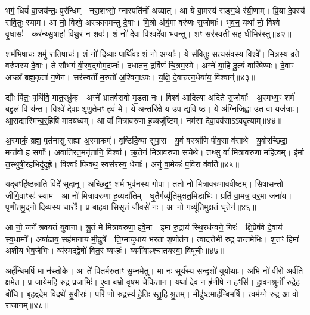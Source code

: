 भगं॒ धियं॑ वा॒जय॑न्तः॒ पुर॑न्धिम्।
नरा॒शꣳसो॒ ग्नास्पति॑र्नो अव्यात्।
आ ये वा॒मस्य॑ सङ्ग॒थे र॑यी॒णाम्।
प्रि॒या दे॒वस्य॑ सवि॒तुः स्या॑म।
आ नो॒ विश्वे॒ अस्क्रा॑गमन्तु दे॒वाः।
मि॒त्रो अ॑र्य॒मा वरु॑णः स॒जोषाः᳚।
भुव॒न्॒ यथा॑ नो॒ विश्वे॑ वृ॒धासः॑।
कर᳚न्थ्सु॒षाहा॑ विथु॒रं न शवः॑।
शं नो॑ दे॒वा वि॒श्वदे॑वा भवन्तु।
शꣳ सर॑स्वती स॒ह धी॒भिर॑स्तु॥४२॥\ip

शम॑भि॒षाचः॒ शमु॑ राति॒षाचः॑।
शं नो॑ दि॒व्याः पार्थि॑वाः॒ शं नो॒ अप्याः᳚।
ये स॑वि॒तुः स॒त्यस॑वस्य॒ विश्वे᳚।
मि॒त्रस्य॑ व्र॒ते वरु॑णस्य दे॒वाः।
ते सौभ॑गं वी॒रव॒द्गोम॒दप्नः॑।
दधा॑तन॒ द्रवि॑णं चि॒त्रम॒स्मे।
अग्ने॑ या॒हि दू॒त्यं॑ वारि॑षेण्यः।
दे॒वाꣳ अच्छा᳚ ब्रह्म॒कृता॑ ग॒णेन॑।
सर॑स्वतीं म॒रुतो॑ अ॒श्विना॒\-ऽपः।
य॒क्षि॒ दे॒वान्र॑त्न॒धेया॑य॒ विश्वान्॑॥४३॥\ip

द्यौः पि॑तः॒ पृथि॑वि॒ मात॒रध्रु॑क्।
अग्ने᳚ भ्रातर्वसवो मृ॒डता॑ नः।
विश्व॑ आदित्या अदिते स॒जोषाः᳚।
अ॒स्मभ्य॒ꣳ॒ शर्म॑ बहु॒लं वि य॑न्त।
विश्वे॑ देवाः शृणु॒तेमꣳ हवं॑ मे।
ये अ॒न्तरि॑क्षे॒ य उप॒ द्यवि॒ ष्ठ।
ये अ॑ग्निजि॒ह्वा उ॒त वा॒ यज॑त्राः।
आ॒सद्या॒स्मिन्ब॒र्॒हिषि॑ मादयध्वम्।
आ वां᳚ मित्रावरुणा ह॒व्यजु॑ष्टिम्।
नम॑सा देवा॒वव॑साऽऽववृत्याम्॥४४॥\ip

अ॒स्माकं॒ ब्रह्म॒ पृत॑नासु सह्या अ॒स्माकम्᳚।
वृ॒ष्टिर्दि॒व्या सु॑पा॒रा।
यु॒वं वस्त्रा॑णि पीव॒सा व॑साथे।
यु॒वोरच्छि॑द्रा॒ मन्त॑वो ह॒ सर्गाः᳚।
अवा॑तिरत॒मनृ॑तानि॒ विश्वा᳚।
ऋ॒तेन॑ मित्रावरुणा सचेथे।
तथ्सु वां᳚ मित्रावरुणा महि॒त्वम्।
ई॒र्मा त॒स्थुषी॒रह॑भिर्दुदुह्रे।
विश्वाः᳚ पिन्वथ॒ स्वस॑रस्य॒ धेनाः᳚।
अनु॑ वा॒मेकः॑ प॒विरा व॑वर्ति॥४५॥\ip

यद्बꣳहि॑ष्ठ॒न्नाति॒ विदे॑ सुदानू।
अच्छि॑द्र॒ꣳ॒ शर्म॒ भुव॑नस्य गोपा।
ततो॑ नो मित्रावरुणाववीष्टम्।
सिषा॑सन्तो जीगि॒वाꣳसः॑ स्याम।
आ नो॑ मित्रावरुणा ह॒व्यदा॑तिम्।
घृ॒तैर्गव्यू॑तिमुक्षत॒मिडा॑भिः।
प्रति॑ वा॒मत्र॒ वर॒मा जना॑य।
पृ॒णी॒तमु॒द्नो दि॒व्यस्य॒ चारोः᳚।
प्र बा॒हवा॑ सिसृतं जी॒वसे॑ नः।
आ नो॒ गव्यू॑तिमुक्षतं घृ॒तेन॑॥४६॥\ip

आ नो॒ जने᳚ श्रवयतं युवाना।
श्रु॒तं मे॑ मित्रावरुणा॒ हवे॒मा।
इ॒मा रु॒द्राय॑ स्थि॒रध॑न्वने॒ गिरः॑।
क्षि॒प्रेष॑वे दे॒वाय॑ स्व॒धाम्ने᳚।
अषा॑ढाय॒ सह॑मानाय मी॒ढुषे᳚।
ति॒ग्मायु॑धाय भरता शृ॒णोत॑न।
त्वाद॑त्तेभी रुद्र॒ शन्त॑मेभिः।
श॒तꣳ हिमा॑ अशीय भेष॒जेभिः॑।
व्य॑स्मद्द्वेषो॑ वित॒रं व्यꣳहः॑।
व्यमी॑वाꣴश्चातयस्वा॒ विषू॑चीः॥४७॥\ip

अर्\mbox{}ह॑न्बिभर्\mbox{}षि॒ मा न॑स्तो॒के।
आ ते॑ पितर्मरुताꣳ सु॒म्नमे॑तु।
मा नः॒ सूर्य॑स्य स॒न्दृशो॑ युयोथाः।
अ॒भि नो॑ वी॒रो अर्व॑ति क्षमेत।
प्र जा॑येमहि रुद्र प्र॒जाभिः॑।
ए॒वा ब॑भ्रो वृषभ चेकितान।
यथा॑ देव॒ न हृ॑णी॒षे न हꣳसि॑।
हा॒व॒न॒श्रूर्नो॑ रुद्रे॒ह बो॑धि।
बृ॒हद्व॑देम वि॒दथे॑ सु॒वीराः᳚।
परि॑ णो रु॒द्रस्य॑ हे॒तिः स्तु॒हि श्रु॒तम्।
मीढु॑ष्ट॒मार्\mbox{}ह॑न्बिभर्\mbox{}षि।
त्वम॑ग्ने रु॒द्र आ वो॒ राजा॑नम्॥४८॥\ip\anuvakamend[वसू॑नि ततानास्तु॒ विश्वान्॑ ववृत्यां ववर्ति घृ॒तेन॒ विषू॑चीः श्रु॒तन्द्वे च॑]

